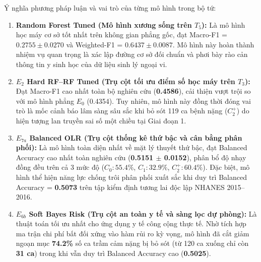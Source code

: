 

Ý nghĩa phương pháp luận và vai trò của từng mô hình trong bộ tứ:
\begin{enumerate}
    \item \textbf{Random Forest Tuned (Mô hình xương sống trên $T_5$):} Là mô hình học máy cơ sở tốt nhất trên không gian phẳng gốc, đạt Macro-F1 = $0.2755 \pm 0.0270$ và Weighted-F1 = $0.6437 \pm 0.0087$. Mô hình này hoàn thành nhiệm vụ quan trọng là xác lập đường cơ sở đối chuẩn và phơi bày rào cản thông tin y sinh học của dữ liệu sinh lý ngoại vi.
    \item \textbf{$E_2$ Hard RF--RF Tuned (Trụ cột tối ưu điểm số học máy trên $T_3$):} Đạt Macro-F1 cao nhất toàn bộ nghiên cứu (\textbf{0.4586}), cải thiện vượt trội so với mô hình phẳng $E_0$ (0.4354). Tuy nhiên, mô hình này đồng thời đóng vai trò là mốc cảnh báo lâm sàng sâu sắc khi bỏ sót 119 ca bệnh nặng ($C_2^+$) do hiện tượng lan truyền sai số một chiều tại Giai đoạn 1.
    \item \textbf{$E_{7a}$ Balanced OLR (Trụ cột thống kê thứ bậc và cân bằng phân phối):} Là mô hình toàn diện nhất về mặt lý thuyết thứ bậc, đạt Balanced Accuracy cao nhất toàn nghiên cứu (\textbf{0.5151 $\pm$ 0.0152}), phân bổ độ nhạy đồng đều trên cả 3 mức độ ($C_0: 55.4\%$, $C_1: 32.9\%$, $C_2^+: 60.4\%$). Đặc biệt, mô hình thể hiện năng lực chống trôi phân phối xuất sắc khi duy trì Balanced Accuracy = \textbf{0.5073} trên tập kiểm định tương lai độc lập NHANES 2015--2016.
    \item \textbf{$E_{6b}$ Soft Bayes Risk (Trụ cột an toàn y tế và sàng lọc dự phòng):} Là thuật toán tối ưu nhất cho ứng dụng y tế công cộng thực tế. Nhờ tích hợp ma trận chi phí bất đối xứng vào hàm rủi ro kỳ vọng, mô hình đã cắt giảm ngoạn mục \textbf{74.2\%} số ca trầm cảm nặng bị bỏ sót (từ 120 ca xuống chỉ còn \textbf{31 ca}) trong khi vẫn duy trì Balanced Accuracy cao (\textbf{0.5025}).
\end{enumerate}

